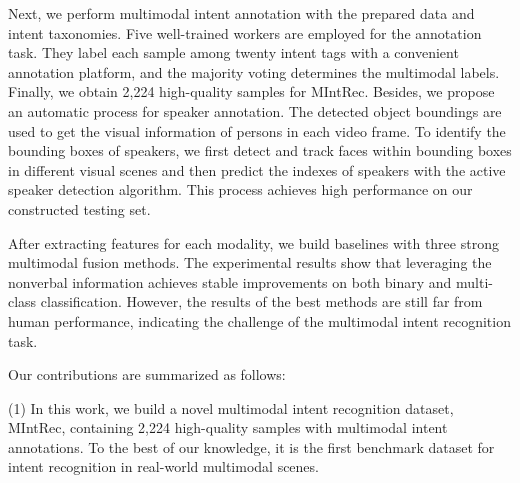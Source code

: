\documentclass[sigconf,camera-ready]{acmart}
\begin{document}
Next, we perform multimodal intent annotation with the prepared data and intent taxonomies. Five well-trained workers are employed for the annotation task. They label each sample among twenty intent tags with a convenient annotation platform, and the majority voting determines the multimodal labels. Finally, we obtain 2,224 high-quality samples for MIntRec. Besides, we propose an automatic process for speaker annotation. The detected object boundings are used to get the visual information of persons in each video frame. To identify the bounding boxes of speakers, we first detect and track faces within bounding boxes in different visual scenes and then predict the indexes of speakers with the active speaker detection algorithm. This process achieves high performance on our constructed testing set. 

After extracting features for each modality, we build baselines with three strong multimodal fusion methods. The experimental results show that leveraging the nonverbal information achieves  stable improvements on both binary and multi-class classification. However, the results of the best methods are still far from human performance, indicating the challenge of the multimodal intent recognition task. 

Our contributions are summarized as follows:

(1) In this work, we build a novel multimodal intent recognition dataset, MIntRec, containing 2,224 high-quality samples with multimodal intent annotations. To the best of our knowledge, it is the first benchmark dataset for intent recognition in real-world multimodal scenes. 
\end{document}
